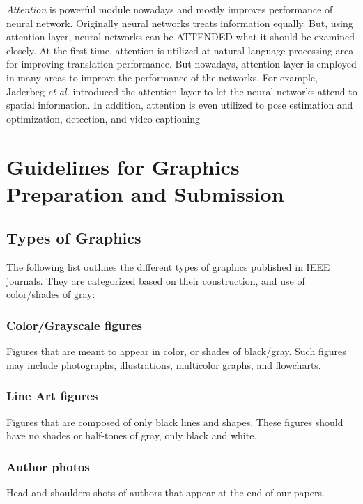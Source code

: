 \documentclass{ieeeaccess}
\begin{document}
\textit{Attention} is powerful module nowadays and mostly improves performance of neural network. Originally neural networks treats information equally. But, using attention layer, neural networks can be ATTENDED what it should be examined closely. At the first time, attention is utilized at natural language processing area for improving translation performance\cite{luong2015effective}. But nowadays, attention layer is employed in many areas to improve the performance of the networks. For example, Jaderbeg \textit{et al.}\cite{jaderberg2015spatial} introduced the attention layer to let the neural networks attend to spatial information. In addition, attention is even utilized to pose estimation and optimization\cite{parisotto2018global}, detection\cite{zhu2018towards}, and video captioning\cite{xu2017learning} 

\section{Guidelines for Graphics Preparation and Submission}
\label{sec:guidelines}

\subsection{Types of Graphics}
The following list outlines the different types of graphics published in 
IEEE journals. They are categorized based on their construction, and use of 
color/shades of gray:

\subsubsection{Color/Grayscale figures}
{Figures that are meant to appear in color, or shades of black/gray. Such 
figures may include photographs, illustrations, multicolor graphs, and 
flowcharts.}

\subsubsection{Line Art figures}
{Figures that are composed of only black lines and shapes. These figures 
should have no shades or half-tones of gray, only black and white.}

\subsubsection{Author photos}
{Head and shoulders shots of authors that appear at the end of our papers. }
\end{document}
